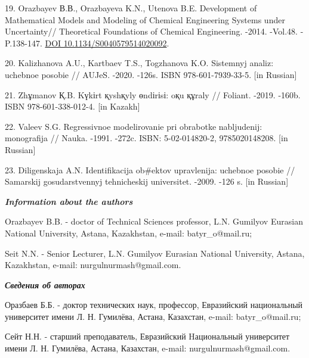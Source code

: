\begin{refs}
19. Orazbayev В.В., Orazbayeva K.N., Utenova B.E. Development of
Mathematical Models and Modeling of Chemical Engineering Systems under
Uncertainty// Theoretical Foundations of Chemical Engineering. -2014.
-Vol.48. -P.138-147.
\href{https://doi.org/10.1134/S0040579514020092}{DOI
10.1134/S0040579514020092}.

20. Kalizhanova A.U., Kartbaev T.S., Togzhanova K.O. Sistemnyj analiz:
uchebnoe posobie // AUJeS. -2020. -126s. ISBN 978-601-7939-33-5. {[}in
Russian{]}

21. Zhұmanov Қ.B. Kүkіrt қyshқyly өndіrіsі: oқu құraly // Foliant.
-2019. -160b. ISBN 978-601-338-012-4. {[}in Kazakh{]}

22. Valeev S.G. Regressivnoe modelirovanie pri obrabotke nabljudenij:
monografija // Nauka. -1991. -272c. ISBN: 5-02-014820-2, 9785020148208.
{[}in Russian{]}

23. Diligenskaja A.N. Identifikacija ob\#ektov upravlenija: uchebnoe
posobie // Samarskij gosudarstvennyj tehnicheskij universitet. -2009.
-126 s. {[}in Russian{]}
\end{refs}

\begin{info}
\hspace{1em}\emph{{\bfseries Information about the authors}}

Orazbayev B.B. - doctor of Technical Sciences professor, L.N. Gumilyov
Eurasian National University, Astana, Kazakhstan, e-mail:
batyr\_o@mail.ru;

Seit N.N. - Senior Lecturer, L.N. Gumilyov Eurasian National University,
Astana, Kazakhstan, e-mail: nurgulnurmash@gmail.com.

\hspace{1em}\emph{{\bfseries Сведения об авторах}}

Оразбаев Б.Б. - доктор технических наук, профессор, Евразийский
национальный университет имени Л. Н. Гумилёва, Астана, Казахстан,
e-mail: batyr\_o@mail.ru;

Сейт Н.Н. - старший преподаватель, Евразийский Hациональный университет
имени Л. Н. Гумилёва, Астана, Казахстан, e-mail: nurgulnurmash@gmail.com.
\end{info}
